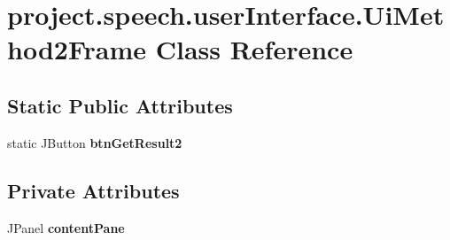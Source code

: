 \section{project.\+speech.\+user\+Interface.\+Ui\+Method2\+Frame Class Reference}
\label{classproject_1_1speech_1_1user_interface_1_1_ui_method2_frame}
\subsection*{Static Public Attributes}
\begin{DoxyCompactItemize}
\item 
static J\+Button {\bf btn\+Get\+Result2}
\end{DoxyCompactItemize}
\subsection*{Private Attributes}
\begin{DoxyCompactItemize}
\item 
J\+Panel {\bf content\+Pane}
\end{DoxyCompactItemize}
